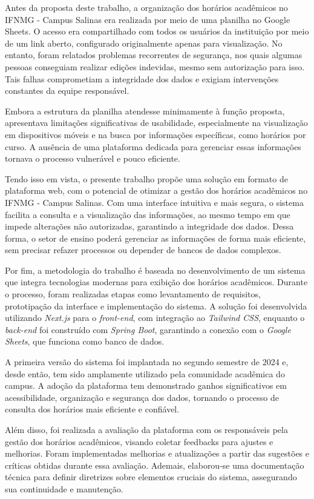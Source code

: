 Antes da proposta deste trabalho, a organização dos horários acadêmicos no IFNMG - Campus Salinas era realizada por meio de uma planilha no Google Sheets. O acesso era compartilhado com todos os usuários da instituição por meio de um link aberto, configurado originalmente apenas para visualização. No entanto, foram relatados problemas recorrentes de segurança, nos quais algumas pessoas conseguiam realizar edições indevidas, mesmo sem autorização para isso. Tais falhas comprometiam a integridade dos dados e exigiam intervenções constantes da equipe responsável.

Embora a estrutura da planilha atendesse minimamente à função proposta, apresentava limitações significativas de usabilidade, especialmente na visualização em dispositivos móveis e na busca por informações específicas, como horários por curso. A ausência de uma plataforma dedicada para gerenciar essas informações tornava o processo vulnerável e pouco eficiente.

Tendo isso em vista, o presente trabalho propõe uma solução em formato de plataforma web, com o potencial de otimizar a gestão dos horários acadêmicos no IFNMG - Campus Salinas. Com uma interface intuitiva e mais segura, o sistema facilita a consulta e a visualização das informações, ao mesmo tempo em que impede alterações não autorizadas, garantindo a integridade dos dados. Dessa forma, o setor de ensino poderá gerenciar as informações de forma mais eficiente, sem precisar refazer processos ou depender de bancos de dados complexos.

Por fim, a metodologia do trabalho é baseada no desenvolvimento de um sistema que integra tecnologias modernas para exibição dos horários acadêmicos. Durante o processo, foram realizadas etapas como levantamento de requisitos, prototipação da interface e implementação do sistema. A solução foi desenvolvida utilizando \textit{Next.js} para o \textit{front-end}, com integração ao \textit{Tailwind CSS}, enquanto o \textit{back-end} foi construído com \textit{Spring Boot}, garantindo a conexão com o \textit{Google Sheets}, que funciona como banco de dados.

A primeira versão do sistema foi implantada no segundo semestre de 2024 e, desde então, tem sido amplamente utilizado pela comunidade acadêmica do campus. A adoção da plataforma tem demonstrado ganhos significativos em acessibilidade, organização e segurança dos dados, tornando o processo de consulta dos horários mais eficiente e confiável.

Além disso, foi realizada a avaliação da plataforma com os responsáveis pela gestão dos horários acadêmicos, visando coletar feedbacks para ajustes e melhorias. Foram implementadas melhorias e atualizações a partir das sugestões e críticas obtidas durante essa avaliação. Ademais, elaborou-se uma documentação técnica para definir diretrizes sobre elementos cruciais do sistema, assegurando sua continuidade e manutenção.

